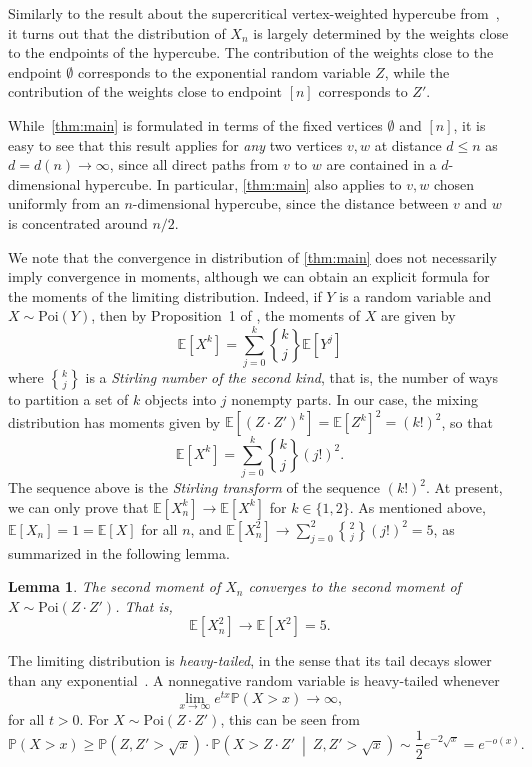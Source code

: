 \documentclass[11pt]{article}
\newtheorem{lemma}[theorem]{Lemma}
\theoremstyle{definition}
\theoremstyle{remark}
\theoremstyle{remark}
\numberwithin{theorem}{section}
\providecommand{\P}{}
\renewcommand{\P}{\mathbb{P}}
\newcommand{\E}{\mathbb{E}}
\DeclareRobustCommand{\stirling}{\genfrac\{\}{0pt}{}}
\begin{document}
Similarly to the result about the supercritical vertex-weighted hypercube from~\cite{berestycki2016number}, it turns out that the distribution of $X_n$ is largely determined by the weights close to the endpoints of the hypercube. The contribution of the weights close to the endpoint $\emptyset$ corresponds to the exponential random variable $Z$, while the contribution of the weights close to endpoint $[n]$ corresponds to $Z'$.

While~\cref{thm:main} is formulated in terms of the fixed vertices $\emptyset$ and $[n]$, it is easy to see that this result applies for \emph{any} two vertices $v,w$ at distance $d\le n$ as $d=d(n)\to\infty$, since all direct paths from $v$ to $w$ are contained in a $d$-dimensional hypercube. In particular, \cref{thm:main} also applies to $v,w$ chosen uniformly from an $n$-dimensional hypercube, since the distance between $v$ and $w$ is concentrated around $n/2$.

We note that the convergence in distribution of \cref{thm:main} does not necessarily imply convergence in moments, although we can obtain an explicit formula for the moments of the limiting distribution. Indeed, if $Y$ is a random variable and $X \sim \text{Poi}(Y)$, then by Proposition~1 of \cite{kuba2016moment}, the moments of $X$ are given by 
\[
    \E[X^{k}] = \sum_{j=0}^{k}\stirling{k}{j}\E[Y^{j}]
\]
where $\stirling{k}{j}$ is a \textit{Stirling number of the second kind}, that is, the number of ways to partition a set of $k$ objects into $j$ nonempty parts. In our case, the mixing distribution has moments given by $\E[(Z\cdot Z')^{k}] = \E[Z^{k}]^{2}= (k!)^{2}$, so that
\[
    \E[X^{k}] = \sum_{j=0}^{k}\stirling{k}{j}(j!)^{2}.
\]
The sequence above is the \textit{Stirling transform} of the sequence $(k!)^{2}.$ At present, we can only prove that $\E[X_{n}^{k}] \to \E[X^{k}]$ for $k \in \{1,2\}$. As mentioned above, $\E[X_{n}] = 1 = \E[X]$ for all $n$, and $\E[X_{n}^{2}] \to \sum_{j=0}^{2}\stirling{2}{j}(j!)^{2} = 5$, as summarized in the following lemma. 

\begin{lemma}\label{lem:2nd-moment}
    The second moment of $X_n$ converges to the second moment of $X\sim \text{Poi}(Z\cdot Z')$. That is,
    \[
    \mathbb{E}[X_n^2]\to \mathbb{E}[X^2]=5.
    \]
\end{lemma}

The limiting distribution is \emph{heavy-tailed}, in the sense that its tail decays slower than any exponential~\citep{nair2022fundamentals}. A nonnegative random variable is heavy-tailed whenever
\[
\lim_{x\to\infty}e^{tx}\P(X>x)\to\infty,
\]
for all $t>0$. For $X\sim \text{Poi}(Z\cdot Z')$, this can be seen from
\[
\P(X>x)\ge \P(Z,Z'>\sqrt{x})\cdot\P\left(X>Z\cdot Z'\ \middle|\ Z,Z'>\sqrt{x}\right)\sim \frac12e^{-2\sqrt{x}}=e^{-o(x)}.
\]
\end{document}

